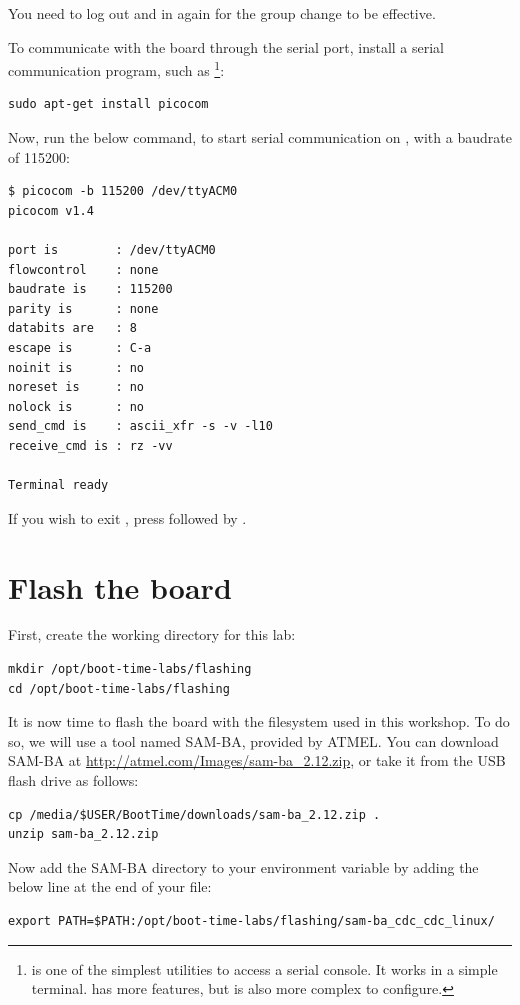 You need to log out and in again for the group change to be effective.

To communicate with the board through the serial port, install a
serial communication program, such as \footnote{
 is one of the simplest utilities to access a
serial console. It works in a simple terminal.  has more
features, but is also more complex to configure.}:

\begin{verbatim}
sudo apt-get install picocom
\end{verbatim}

Now, run the below command, to start serial communication on
, with a baudrate of 115200:

\begin{verbatim}
$ picocom -b 115200 /dev/ttyACM0
picocom v1.4

port is        : /dev/ttyACM0
flowcontrol    : none
baudrate is    : 115200
parity is      : none
databits are   : 8
escape is      : C-a
noinit is      : no
noreset is     : no
nolock is      : no
send_cmd is    : ascii_xfr -s -v -l10
receive_cmd is : rz -vv

Terminal ready
\end{verbatim}

If you wish to exit , press \code{[Ctrl][a]} followed by
\code{[Ctrl][x]}.

\section{Flash the board}

First, create the working directory for this lab:

\begin{verbatim}
mkdir /opt/boot-time-labs/flashing
cd /opt/boot-time-labs/flashing
\end{verbatim}

It is now time to flash the board with the filesystem used in this
workshop. To do so, we will use a tool named SAM-BA, provided by
ATMEL. You can download SAM-BA at
\url{http://atmel.com/Images/sam-ba_2.12.zip}, or take it from the USB
flash drive as follows:

\begin{verbatim}
cp /media/$USER/BootTime/downloads/sam-ba_2.12.zip .
unzip sam-ba_2.12.zip
\end{verbatim}

Now add the SAM-BA directory to your  environment variable
by adding the below line at the end of your  file:
\begin{verbatim}
export PATH=$PATH:/opt/boot-time-labs/flashing/sam-ba_cdc_cdc_linux/
\end{verbatim}

